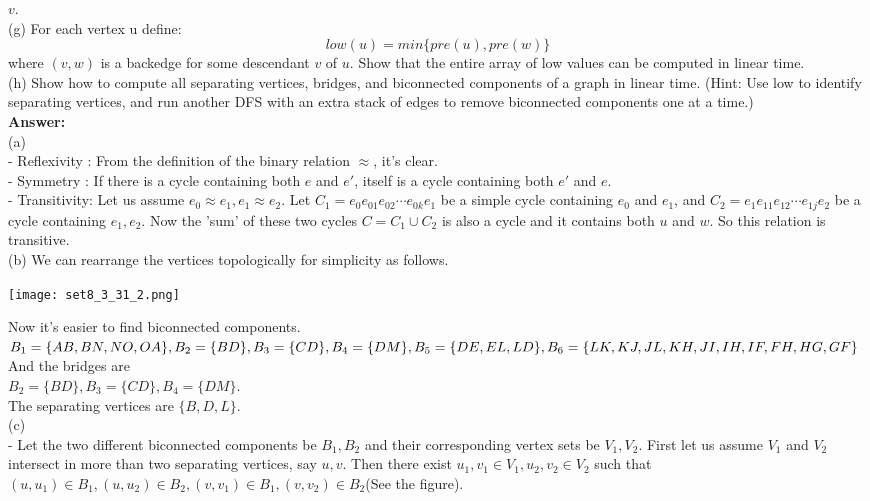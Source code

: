 \documentclass{article}
\begin{document}
$v$.\\
(g) For each vertex u define:\\
\[
low(u)=min\{pre(u), pre(w)\}
\]
where $(v, w)$ is a backedge for some descendant $v$ of $u$. Show that the entire array of low values can be computed in linear time.\\
(h) Show how to compute all separating vertices, bridges, and biconnected components of a graph in linear time. (Hint: Use low to identify separating vertices, and run another DFS
with an extra stack of edges to remove biconnected components one at a time.)\\
{\bf Answer:}\\
\noindent
(a) \\
- Reflexivity : From the definition of the binary relation $\approx$, it's clear.\\
- Symmetry : If there is a cycle containing both $e$ and $e'$, itself is a cycle containing both $e'$ and $e$. \\
- Transitivity: Let us assume $e_0\approx e_1, e_1\approx e_2$. Let $C_1=e_0e_{01}e_{02}\cdots e_{0k}e_1$ be a simple cycle containing $e_0$ and $e_1$, and $C_2=e_1e_{11}e_{12}\cdots e_{1j}e_2$ be a cycle containing $e_1, e_2$. Now the 'sum' of these two cycles $C=C_1\cup C_2$ is also a cycle and it contains both $u$ and $w$. So this relation is transitive.\\
(b) We can rearrange the vertices topologically for simplicity as follows.
\begin{center}
	\centering
	\texttt{[image: set8\_3\_31\_2.png]}
\end{center}
Now it's easier to find biconnected components.\\
$B_1=\{AB, BN , NO, OA\}, B_2=\{BD\}, B_3=\{CD\}, B_4=\{DM\},\\ B_5=\{DE, EL, LD\}, B_6=\{LK, KJ, JL, KH, JI, IH, IF, FH, HG, GF\}$\\
And the bridges are \\
$B_2=\{BD\}, B_3=\{CD\}, B_4=\{DM\}.$\\
The separating vertices are $\{B, D, L\}$.\\
(c) \\
- Let the two different biconnected components be $B_1, B_2$ and their corresponding vertex sets be $V_1, V_2$. First let us assume $V_1$ and $V_2$ intersect in more than two separating vertices, say $u, v$. Then there exist $u_1, v_1\in V_1, u_2, v_2\in V_2$ such that $ (u, u_1)\in B_1, (u, u_2)\in B_2, (v, v_1)\in B_1, (v, v_2)\in B_2$(See the figure).
\end{document}
